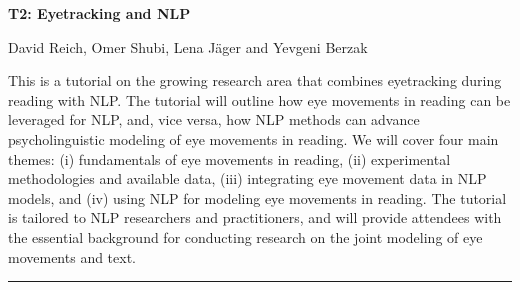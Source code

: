 \begin{center}
    \Large{\textbf{T2: Eyetracking and NLP}\\}
    \par\bigskip
    \large{David Reich, Omer Shubi, Lena Jäger and Yevgeni Berzak}\\
    \par\bigskip

\end{center}

This is a tutorial on the growing research area that combines eyetracking during reading with NLP. The tutorial will outline how eye movements in reading can be leveraged for NLP, and, vice versa, how NLP methods can advance psycholinguistic modeling of eye movements in reading. We will cover four main themes: (i) fundamentals of eye movements in reading, (ii) experimental methodologies and available data, (iii) integrating eye movement data in NLP models, and (iv) using NLP for modeling eye movements in reading. The tutorial is tailored to NLP researchers and practitioners, and will provide attendees with the essential background for conducting research on the joint modeling of eye movements and text.

\begin{center}
    \noindent\rule{200px}{1pt}
\end{center}
